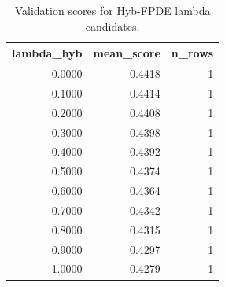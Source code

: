 \begin{table}[t]
\caption{Validation scores for Hyb-FPDE lambda candidates.}
\label{tab:lambda_distribution_computed}
\centering
\begin{tabular}{rrr}
\toprule
lambda\_hyb & mean\_score & n\_rows \\
\midrule
0.0000 & 0.4418 & 1 \\
0.1000 & 0.4414 & 1 \\
0.2000 & 0.4408 & 1 \\
0.3000 & 0.4398 & 1 \\
0.4000 & 0.4392 & 1 \\
0.5000 & 0.4374 & 1 \\
0.6000 & 0.4364 & 1 \\
0.7000 & 0.4342 & 1 \\
0.8000 & 0.4315 & 1 \\
0.9000 & 0.4297 & 1 \\
1.0000 & 0.4279 & 1 \\
\bottomrule
\end{tabular}

\end{table}
